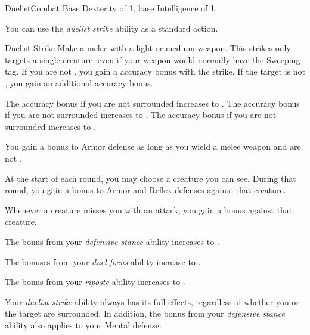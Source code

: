     \begin{feat}{Duelist}{Combat}
        \featpre Base Dexterity of 1, base Intelligence of 1.

         You can use the \textit{duelist strike} ability as a standard action.
        \begin{freeability}{Duelist Strike}
            Make a melee  with a light or medium weapon.
            This strikes only targets a single creature, even if your weapon would normally have the Sweeping tag.
            If you are not \surrounded, you gain a  accuracy bonus with the strike.
            If the target is not \surrounded, you gain an additional  accuracy bonus.

            \rankline
             The accuracy bonus if you are not surrounded increases to .
             The accuracy bonus if you are not surrounded increases to .
             The accuracy bonus if you are not surrounded increases to .
        \end{freeability}

         You gain a  bonus to Armor defense as long as you wield a melee weapon and are not \surrounded.

         At the start of each round, you may choose a creature you can see.
        During that round, you gain a  bonus to Armor and Reflex defenses against that creature.

         Whenever a creature misses you with an attack, you  gain a   bonus against that creature.

         The bonus from your \textit{defensive stance} ability increases to .

         The bonuses from your \textit{duel focus} ability increase to .

         The bonus from your \textit{riposte} ability increases to .

         Your \textit{duelist strike} ability always has its full effects, regardless of whether you or the target are surrounded.
        In addition, the bonus from your \textit{defensive stance} ability also applies to your Mental defense.
    \end{feat}

